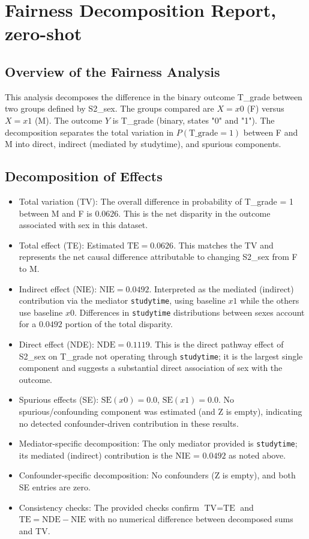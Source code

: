 \documentclass{article}
\begin{document}
\section*{Fairness Decomposition Report, zero-shot}

\subsection*{Overview of the Fairness Analysis}
This analysis decomposes the difference in the binary outcome T\_grade between two groups defined by S2\_sex. The groups compared are $X = x0$ (F) versus $X = x1$ (M). The outcome $Y$ is T\_grade (binary, states "0" and "1"). The decomposition separates the total variation in $P(\text{T\_grade} = 1)$ between F and M into direct, indirect (mediated by studytime), and spurious components.

\subsection*{Decomposition of Effects}
\begin{itemize}
  \item Total variation (TV): The overall difference in probability of T\_grade = 1 between M and F is $0.0626$. This is the net disparity in the outcome associated with sex in this dataset.
  \item Total effect (TE): Estimated $\text{TE} = 0.0626$. This matches the TV and represents the net causal difference attributable to changing S2\_sex from F to M.
  \item Indirect effect (NIE): $\text{NIE} = 0.0492$. Interpreted as the mediated (indirect) contribution via the mediator \texttt{studytime}, using baseline $x1$ while the others use baseline $x0$. Differences in \texttt{studytime} distributions between sexes account for a $0.0492$ portion of the total disparity.
  \item Direct effect (NDE): $\text{NDE} = 0.1119$. This is the direct pathway effect of S2\_sex on T\_grade not operating through \texttt{studytime}; it is the largest single component and suggests a substantial direct association of sex with the outcome.
  \item Spurious effects (SE): $\text{SE}(x0) = 0.0$, $\text{SE}(x1) = 0.0$. No spurious/confounding component was estimated (and Z is empty), indicating no detected confounder-driven contribution in these results.
  \item Mediator-specific decomposition: The only mediator provided is \texttt{studytime}; its mediated (indirect) contribution is the NIE = $0.0492$ as noted above.
  \item Confounder-specific decomposition: No confounders (Z is empty), and both SE entries are zero.
  \item Consistency checks: The provided checks confirm $\text{TV} = \text{TE}$ and $\text{TE} = \text{NDE} - \text{NIE}$ with no numerical difference between decomposed sums and TV.
\end{itemize}
\end{document}
